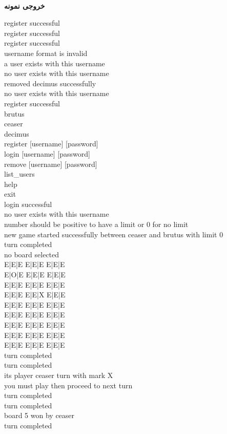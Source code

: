 \documentclass[]{article}
\newcommand{\outputsample}[1]{
    ~\\
    \textbf{خروجی نمونه}

    \begin{tcolorbox}[breakable,boxrule=0pt]
        \begin{latin}
            \large{
                #1
            }
        \end{latin}
    \end{tcolorbox}
}
\begin{document}
\outputsample{
register successful\\
register successful\\
register successful\\
username format is invalid\\
a user exists with this username\\
no user exists with this username\\
removed decimus successfully\\
no user exists with this username\\
register successful\\
brutus\\
ceaser\\
decimus\\
register [username] [password]\\
login [username] [password]\\
remove [username] [password]\\
list\_users\\
help\\
exit\\
login successful\\
no user exists with this username\\
number should be positive to have a limit or 0 for no limit\\
new game started successfully between ceaser and brutus with limit 0\\
turn completed\\
no board selected\\
E|E|E E|E|E E|E|E\\
E|O|E E|E|E E|E|E\\
E|E|E E|E|E E|E|E\\
E|E|E E|E|X E|E|E\\ 
E|E|E E|E|E E|E|E\\
E|E|E E|E|E E|E|E\\
E|E|E E|E|E E|E|E\\ 
E|E|E E|E|E E|E|E\\ 
E|E|E E|E|E E|E|E\\
turn completed\\
turn completed\\
its player ceaser turn with mark X\\
you must play then proceed to next turn\\
turn completed\\
turn completed\\
board 5 won by ceaser\\
turn completed\\
}
\end{document}
